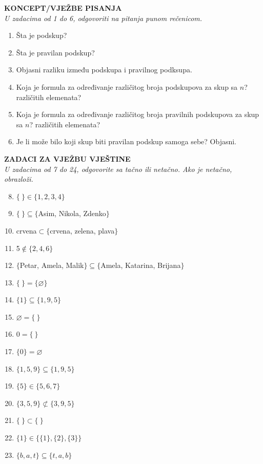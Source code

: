 \documentclass[a4paper,14pt,svgnames]{article}
\newcounter{counter}
\begin{document}
\begin{tcolorbox}[title=\textbf{ZADACI ZA VJEŽBU}]
\begin{minipage}{0.5\textwidth}
\textbf{KONCEPT/VJEŽBE PISANJA}\\
\textit{U zadacima od 1 do 6, odgovoriti na pitanja punom rečenicom.}
\begin{enumerate}
\item Šta je podskup?
\item Šta je pravilan podskup?
\item Objasni razliku između podskupa i pravilnog podksupa.
\item Koja je formula za određivanje različitog broja podskupova za skup sa $n$? različitih elemenata?
\item Koja je formula za određivanje različitog broja pravilnih podskupova za skup sa $n$? različitih elemenata?
\item Je li može bilo koji skup biti pravilan podskup samoga sebe? Objasni.
\end{enumerate}
\textbf{ZADACI ZA VJEŽBU VJEŠTINE}\\
\textit{U zadacima od 7 do 24, odgovorite sa tačno ili netačno. Ako je netačno, obrazloži.}
\begin{enumerate}
\setcounter{enumi}{7}
\item $\{\ \}\in \{1, 2, 3, 4\}$
\end{enumerate}
\end{minipage}
\begin{minipage}{0.5\textwidth}
\begin{enumerate}
\setcounter{enumi}{8}
\item $\{\ \}\subseteq \{$Asim, Nikola, Zdenko$\}$
\item crvena$\subset \{$crvena, zelena, plava$\}$
\item 5$\not\in \{2,4,6\}$
\item $\{$Petar, Amela, Malik$\}\subseteq \{$Amela, Katarina, Brijana$\}$
\item $\{\ \}=\{\varnothing \}$
\item $\{1\}\subseteq \{1, 9, 5\}$
\item $\varnothing =\{\ \}$
\item $0=\{\ \}$
\item $\{0\}=\varnothing$
\item $\{1, 5, 9\}\subseteq \{1, 9, 5\}$
\item $\{5\}\in \{5, 6, 7\}$
\item $\{3, 5, 9\}\not\subset \{3, 9, 5\}$
\item $\{\ \}\subset \{\ \}$
\item $\{1\}\in \{\{1\}, \{2\}, \{3\}\}$
\item $\{b, a, t\}\subseteq \{t, a, b\}$
\end{enumerate}
\end{minipage}
\end{tcolorbox}
\end{document}
